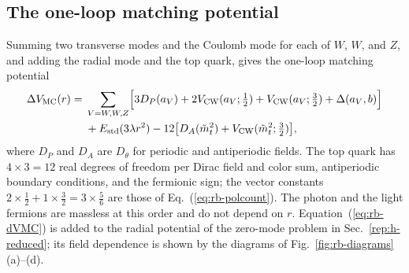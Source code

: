 \subsection{The one-loop matching potential}
\label{sec:rb-dVMC}

Summing two transverse modes and the Coulomb mode for each of $W$, $W$, and $Z$, and adding the radial mode and the top quark, gives the one-loop matching potential
\begin{align}
\Delta V_{\rm MC}(r)={}&\sum_{V=W,W,Z}\Bigl[3D_P(a_V)+2V_{\rm CW}(a_V;\tfrac12)+V_{\rm CW}(a_V;\tfrac32)+\Delta(a_V,b)\Bigr]\nonumber\\
&+E_{\rm std}(3\lambda r^2)-12\bigl[D_A(\tilde m_t^2)+V_{\rm CW}(\tilde m_t^2;\tfrac32)\bigr],
\label{eq:rb-dVMC}
\end{align}
where $D_P$ and $D_A$ are $D_\theta$ for periodic and antiperiodic fields.
The top quark has $4\times3=12$ real degrees of freedom per Dirac field and color sum, antiperiodic boundary conditions, and the fermionic sign; the vector constants $2\times\frac12+1\times\frac32=3\times\frac56$ are those of Eq.~(\ref{eq:rb-polcount}).
The photon and the light fermions are massless at this order and do not depend on $r$.
Equation~(\ref{eq:rb-dVMC}) is added to the radial potential of the zero-mode problem in Sec.~\ref{rep:h-reduced}; its field dependence is shown by the diagrams of Fig.~\ref{fig:rb-diagrams}(a)--(d).

